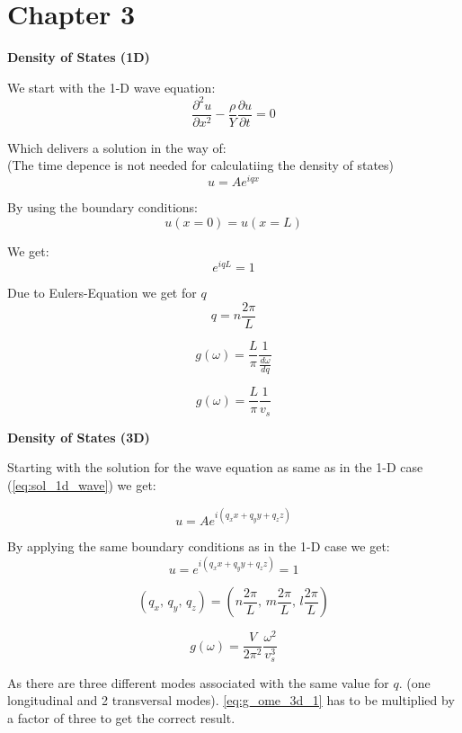 \section{Chapter 3}

\textbf{Density of States (1D)}

We start with the 1-D wave equation:
$$\frac{\partial^2 u}{\partial x^2} - \frac{\rho}{Y} \frac{\partial u}{\partial t} = 0$$

Which delivers a solution in the way of:\\
(The time depence is not needed for calculatiing the density of states)
\begin{equation}
    u = Ae^{iqx}
    \label{eq:sol_1d_wave}
\end{equation}

By using the boundary conditions:
$$u(x=0) = u(x=L)$$

We get:
$$e^{iqL} = 1$$

Due to Eulers-Equation we get for $q$
$$q = n \frac{2\pi}{L}$$


\begin{equation}
    g(\omega) = \frac{L}{\pi} \frac{1}{\frac{d\omega}{d q}}
\end{equation}

\begin{equation}
    g(\omega) = \frac{L}{\pi} \frac{1}{v_s}
\end{equation}

\textbf{Density of States (3D)}

Starting with the solution for the wave equation as same as in the 1-D case
(\autoref{eq:sol_1d_wave}) we get:

\begin{equation}
    u = Ae^{i(q_x x + q_y y + q_z z)}
\end{equation}

By applying the same boundary conditions as in the 1-D case we get:
\begin{equation}
    u = e^{i(q_x x + q_y y + q_z z)} = 1
\end{equation}

$$(q_x, \, q_y,\, q_z) = (n \frac{2\pi}{L}, \, m \frac{2\pi}{L}, \, l \frac{2\pi}{L})$$

\begin{equation}
    g(\omega) = \frac{V}{2\pi^2} \frac{\omega^2}{v_s^3}
    \label{eq:g_ome_3d_1}
\end{equation}

As there are three different modes associated with the same value for $q$.
(one longitudinal and 2 transversal modes). \autoref{eq:g_ome_3d_1} has to be
multiplied by a factor of three to get the correct result.

